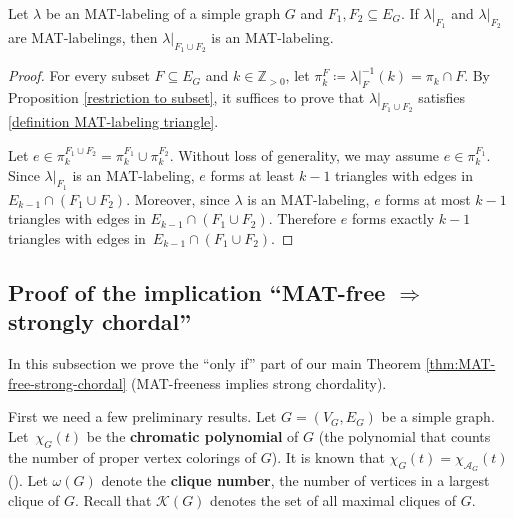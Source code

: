 \documentclass[ALCO, Unicode,published]{cedram}
\newcommand{\mcK}{\mathcal{K}}
\begin{document}
\begin{lemma}\label{restriction to the union}
Let $ \lambda $ be an MAT-labeling of a simple graph $ G $ and $ F_{1}, F_{2} \subseteq E_{G} $. 
If $ \lambda|_{F_{1}} $ and $ \lambda|_{F_{2}} $ are MAT-labelings, then $ \lambda|_{F_{1} \cup F_{2}} $ is an MAT-labeling. 
\end{lemma}
\begin{proof}
For every subset $ F \subseteq E_{G} $ and $ k \in \mathbb{Z}_{>0} $, let $ \pi_{k}^{F} \coloneqq \lambda|_{F}^{-1}(k) = \pi_{k} \cap F $.
By Proposition  \ref{restriction to subset}, it suffices to prove that $ \lambda|_{F_{1} \cup F_{2}} $ satisfies \ref{definition MAT-labeling triangle}. 

Let $ e \in \pi_{k}^{F_{1}\cup F_{2}} = \pi_{k}^{F_{1}} \cup \pi_{k}^{F_{2}} $. 
Without loss of generality, we may assume $ e \in \pi_{k}^{F_{1}} $. 
Since $ \lambda|_{F_{1}} $ is an MAT-labeling, $ e $ forms at least $ k-1 $ triangles with edges in~$ E_{k-1} \cap (F_{1} \cup F_{2}) $. 
Moreover, since $ \lambda $ is an MAT-labeling, $ e $ forms at most $ k-1 $ triangles with edges in $ E_{k-1} \cap (F_{1} \cup F_{2}) $. 
Therefore $ e $ forms exactly $ k-1 $ triangles with edges in~$ E_{k-1} \cap (F_{1} \cup F_{2}) $. 
\end{proof}

\subsection{Proof of the implication ``MAT-free \texorpdfstring{$\Rightarrow$}{implies} strongly chordal''}
\label{subsec:MAT-free implies strongly chordal}
 
In this subsection we prove the ``only if'' part of our main Theorem \ref{thm:MAT-free-strong-chordal} (MAT-freeness implies strong chordality).

First we need a few preliminary results.
Let $ G = (V_{G}, E_{G}) $ be a simple graph. 
Let~$ \chi_G(t)$ be the \textbf{chromatic polynomial} of $G$ (the polynomial that counts the number of proper vertex colorings of $G$). 
It is known that $ \chi_G(t) = \chi_{ \mathcal{A}_{G} }(t) $ (\eg  \cite[Theorem 2.88]{OT92}).
Let $ \omega(G) $ denote the \textbf{clique number}, the number of vertices in a largest clique of $ G $. 
Recall that $\mcK(G)$ denotes the set of all maximal cliques of $G$.
\end{document}
